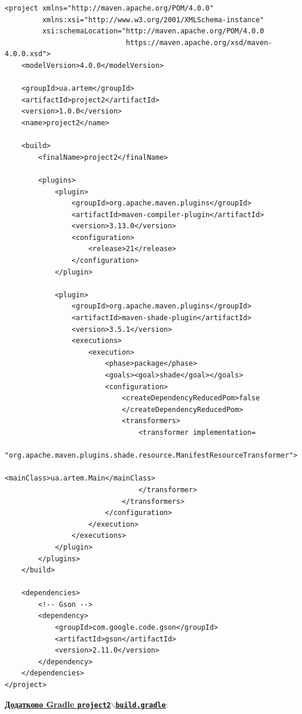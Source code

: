 \documentclass[12pt,a4paper]{article}
\begin{document}
    \begin{verbatim}
<project xmlns="http://maven.apache.org/POM/4.0.0"
         xmlns:xsi="http://www.w3.org/2001/XMLSchema-instance"
         xsi:schemaLocation="http://maven.apache.org/POM/4.0.0
                             https://maven.apache.org/xsd/maven-4.0.0.xsd">
    <modelVersion>4.0.0</modelVersion>

    <groupId>ua.artem</groupId>
    <artifactId>project2</artifactId>
    <version>1.0.0</version>
    <name>project2</name>

    <build>
        <finalName>project2</finalName>

        <plugins>
            <plugin>
                <groupId>org.apache.maven.plugins</groupId>
                <artifactId>maven-compiler-plugin</artifactId>
                <version>3.13.0</version>
                <configuration>
                    <release>21</release>
                </configuration>
            </plugin>

            <plugin>
                <groupId>org.apache.maven.plugins</groupId>
                <artifactId>maven-shade-plugin</artifactId>
                <version>3.5.1</version>
                <executions>
                    <execution>
                        <phase>package</phase>
                        <goals><goal>shade</goal></goals>
                        <configuration>
                            <createDependencyReducedPom>false
                            </createDependencyReducedPom>
                            <transformers>
                                <transformer implementation=
          "org.apache.maven.plugins.shade.resource.ManifestResourceTransformer">
                                    <mainClass>ua.artem.Main</mainClass>
                                </transformer>
                            </transformers>
                        </configuration>
                    </execution>
                </executions>
            </plugin>
        </plugins>
    </build>

    <dependencies>
        <!-- Gson -->
        <dependency>
            <groupId>com.google.code.gson</groupId>
            <artifactId>gson</artifactId>
            <version>2.11.0</version>
        </dependency>
    </dependencies>
</project>
    \end{verbatim}

    \textbf{\underline{Додатково Gradle \texttt{project2$\backslash$build.gradle}}}:
\end{document}
